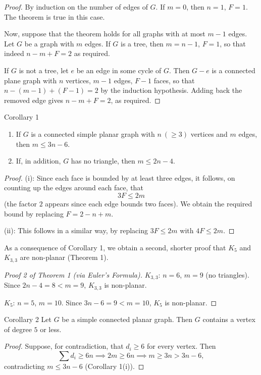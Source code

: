 \begin{proof}
By induction on the number of edges of $G$. If $m = 0$, then $n = 1$, $F = 1$. The theorem is true in this case.

Now, suppose that the theorem holds for all graphs with at most $m-1$ edges. Let $G$ be a graph with $m$ edges. If $G$ is a tree, then $m = n-1$, $F = 1$, so that indeed $n - m + F = 2$ as required.

If $G$ is not a tree, let $e$ be an edge in some cycle of $G$. Then $G - e$ is a connected plane graph with $n$ vertices, $m-1$ edges, $F-1$ faces, so that $n - (m-1) + (F-1) = 2$ by the induction hypothesis. Adding back the removed edge gives $n - m + F = 2$, as required.
\end{proof}

\begin{thmbox}{Corollary 1}
\begin{enumerate}
  \item[(i)] If $G$ is a connected simple planar graph with $n\ (\geq 3)$ vertices and $m$ edges, then $m \leq 3n - 6$.
  \item[(ii)] If, in addition, $G$ has no triangle, then $m \leq 2n - 4$.
\end{enumerate}
\end{thmbox}

\begin{proof}
(i): Since each face is bounded by at least three edges, it follows, on counting up the edges around each face, that
$$3F \leq 2m$$
(the factor $2$ appears since each edge bounds two faces). We obtain the required bound by replacing $F = 2 - n + m$.

\medskip
\noindent (ii): This follows in a similar way, by replacing $3F \leq 2m$ with $4F \leq 2m$.
\end{proof}

\medskip
\noindent As a consequence of Corollary 1, we obtain a second, shorter proof that $K_5$ and $K_{3,3}$ are non-planar (Theorem 1).

\begin{proof}[Proof 2 of Theorem 1 (via Euler's Formula)]
$K_{3,3}$: $n=6$, $m=9$ (no triangles). Since $2n-4 = 8 < m = 9$, $K_{3,3}$ is non-planar.

\medskip
\noindent $K_5$: $n=5$, $m=10$. Since $3n-6 = 9 < m = 10$, $K_5$ is non-planar.
\end{proof}

\begin{thmbox}{Corollary 2}
Let $G$ be a simple connected planar graph. Then $G$ contains a vertex of degree $5$ or less.
\end{thmbox}

\begin{proof}
Suppose, for contradiction, that $d_i \geq 6$ for every vertex. Then
$$\sum d_i \geq 6n \implies 2m \geq 6n \implies m \geq 3n > 3n - 6,$$
contradicting $m \leq 3n-6$ (Corollary 1(i)).
\end{proof}
